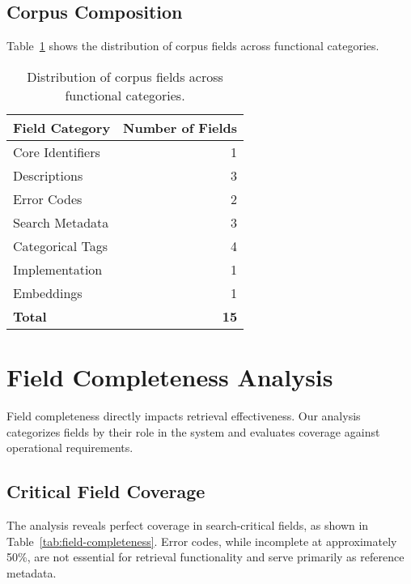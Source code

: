 \subsection{Corpus Composition}

Table~\ref{tab:corpus-composition} shows the distribution of corpus fields across functional categories.

\begin{table}[h]
\centering
\begin{tabular}{lr}
\toprule
\textbf{Field Category} & \textbf{Number of Fields} \\
\midrule
Core Identifiers & 1 \\
Descriptions & 3 \\
Error Codes & 2 \\
Search Metadata & 3 \\
Categorical Tags & 4 \\
Implementation & 1 \\
Embeddings & 1 \\
\midrule
\textbf{Total} & \textbf{15} \\
\bottomrule
\end{tabular}
\caption{Distribution of corpus fields across functional categories.}
\label{tab:corpus-composition}
\end{table}

\section{Field Completeness Analysis}

Field completeness directly impacts retrieval effectiveness. Our analysis categorizes fields by their role in the system and evaluates coverage against operational requirements.

\subsection{Critical Field Coverage}

The analysis reveals perfect coverage in search-critical fields, as shown in Table~\ref{tab:field-completeness}. Error codes, while incomplete at approximately 50\%, are not essential for retrieval functionality and serve primarily as reference metadata.

